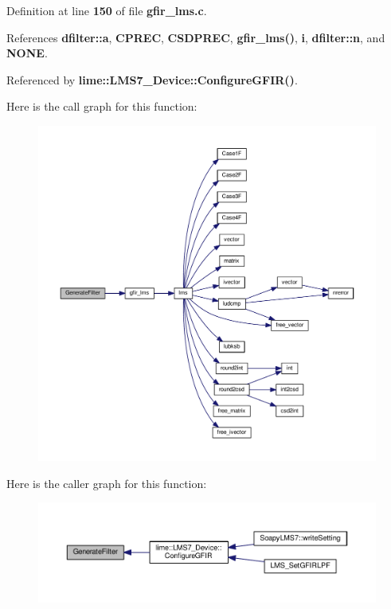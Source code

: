 Definition at line {\bf 150} of file {\bf gfir\+\_\+lms.\+c}.



References {\bf dfilter\+::a}, {\bf C\+P\+R\+EC}, {\bf C\+S\+D\+P\+R\+EC}, {\bf gfir\+\_\+lms()}, {\bf i}, {\bf dfilter\+::n}, and {\bf N\+O\+NE}.



Referenced by {\bf lime\+::\+L\+M\+S7\+\_\+\+Device\+::\+Configure\+G\+F\+I\+R()}.



Here is the call graph for this function\+:
\nopagebreak
\begin{figure}[H]
\begin{center}
\leavevmode
\includegraphics[width=350pt]{d7/db9/gfir__lms_8c_aece642dbd2b79ac92bf1d0003110e5e0_cgraph}
\end{center}
\end{figure}




Here is the caller graph for this function\+:
\nopagebreak
\begin{figure}[H]
\begin{center}
\leavevmode
\includegraphics[width=350pt]{d7/db9/gfir__lms_8c_aece642dbd2b79ac92bf1d0003110e5e0_icgraph}
\end{center}
\end{figure}


